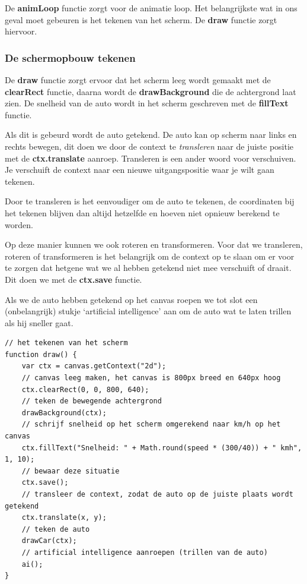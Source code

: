\documentclass[a4paper]{report}
\begin{document}
\noindent De \textbf{animLoop} functie zorgt voor de animatie loop. Het belangrijkste wat in ons geval moet gebeuren is het tekenen van het scherm. De \textbf{draw} functie zorgt hiervoor. 

\subsubsection*{De schermopbouw tekenen}

De \textbf{draw} functie zorgt ervoor dat het scherm leeg wordt gemaakt met de \textbf{clearRect} functie, daarna wordt de \textbf{drawBackground} die de achtergrond laat zien. De snelheid van de auto wordt in het scherm geschreven met de \textbf{fillText} functie.

Als dit is gebeurd wordt de auto getekend. De auto kan op scherm naar links en rechts bewegen, dit doen we door de context te \emph{transleren} naar de juiste positie met de \textbf{ctx.translate} aanroep. Transleren is een ander woord voor verschuiven. Je verschuift de context naar een nieuwe uitgangspositie waar je wilt gaan tekenen.

Door te transleren is het eenvoudiger om de auto te tekenen, de coordinaten bij het tekenen blijven dan altijd hetzelfde en hoeven niet opnieuw berekend te worden.

Op deze manier kunnen we ook roteren en transformeren. Voor dat we transleren, roteren of transformeren is het belangrijk om de context op te slaan om er voor te zorgen dat hetgene wat we al hebben getekend niet mee verschuift of draait. Dit doen we met de \textbf{ctx.save} functie.

Als we de auto hebben getekend op het canvas roepen we tot slot een (onbelangrijk) stukje `artificial intelligence' aan om de auto wat te laten trillen als hij sneller gaat.

\begin{lstlisting}[numbers=none]
// het tekenen van het scherm
function draw() {
	var ctx = canvas.getContext("2d");
 	// canvas leeg maken, het canvas is 800px breed en 640px hoog
	ctx.clearRect(0, 0, 800, 640);
 	// teken de bewegende achtergrond
	drawBackground(ctx);
	// schrijf snelheid op het scherm omgerekend naar km/h op het canvas
	ctx.fillText("Snelheid: " + Math.round(speed * (300/40)) + " kmh", 1, 10);
  	// bewaar deze situatie
	ctx.save();
	// transleer de context, zodat de auto op de juiste plaats wordt getekend
	ctx.translate(x, y);
	// teken de auto
	drawCar(ctx);
	// artificial intelligence aanroepen (trillen van de auto)
	ai();
}
\end{lstlisting}
\end{document}
